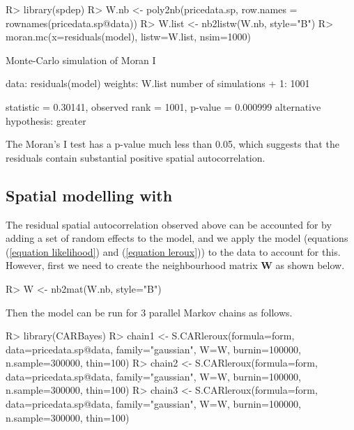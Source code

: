 \documentclass[article,shortnames,nojss]{jss}
\begin{document}
\begin{Schunk}
\begin{Sinput}
R> library(spdep)
R> W.nb <- poly2nb(pricedata.sp, row.names = rownames(pricedata.sp@data))
R> W.list <- nb2listw(W.nb, style="B")
R> moran.mc(x=residuals(model), listw=W.list, nsim=1000)
\end{Sinput}
\begin{Soutput}
	Monte-Carlo simulation of Moran I

data:  residuals(model) 
weights: W.list  
number of simulations + 1: 1001 

statistic = 0.30141, observed rank = 1001, p-value = 0.000999
alternative hypothesis: greater
\end{Soutput}
\end{Schunk}
    
    
The Moran's I test has  a p-value much less than 0.05, which suggests that the residuals contain substantial positive spatial autocorrelation.


\subsection[Spatial modelling with CARBayes]{Spatial modelling with }
The residual spatial autocorrelation observed above can be accounted for by adding a set of random effects to the model, and we apply the  model (equations (\ref{equation likelihood}) and  (\ref{equation leroux})) to the data to account for this. However, first we need to create the neighbourhood matrix $\mathbf{W}$ as shown below.

\begin{Schunk}
\begin{Sinput}
R> W <- nb2mat(W.nb, style="B")
\end{Sinput}
\end{Schunk}

Then the model can be run for 3 parallel Markov chains as follows.

\begin{CodeInput}
R> library(CARBayes)
R> chain1 <- S.CARleroux(formula=form, data=pricedata.sp@data, family="gaussian", W=W, 
      burnin=100000, n.sample=300000, thin=100)
R> chain2 <- S.CARleroux(formula=form, data=pricedata.sp@data, family="gaussian", W=W, 
      burnin=100000, n.sample=300000, thin=100)
R> chain3 <- S.CARleroux(formula=form, data=pricedata.sp@data, family="gaussian", W=W, 
      burnin=100000, n.sample=300000, thin=100)
\end{CodeInput}
\end{document}
